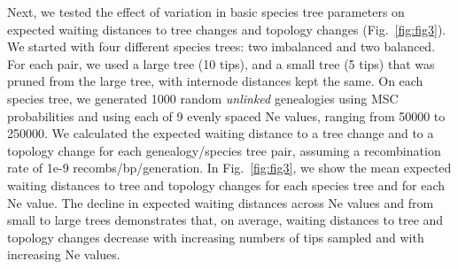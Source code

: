 \documentclass[11pt]{article}
\begin{document}

Next, we tested the effect of variation in basic species tree parameters on expected waiting 
distances to tree changes and topology changes (Fig.~\ref{fig:fig3}). We started with four 
different species trees: two imbalanced and two balanced. For each pair, we used a large tree 
(10 tips), and a small tree (5 tips) that was pruned from the large tree, with internode 
distances kept the same. On each species tree, we generated 1000 random \emph{unlinked} 
genealogies using MSC probabilities and using 
each of 9 evenly spaced Ne values, ranging from 50000 to 250000. We calculated the expected 
waiting distance 
to a tree change and to a topology change for each genealogy/species tree pair, assuming a 
recombination rate of 1e-9 recombs/bp/generation. In Fig.~\ref{fig:fig3}, we show the mean 
expected waiting distances to tree and topology changes for each species tree and for each Ne 
value. The decline in expected waiting distances across Ne values and from small to large 
trees demonstrates that, on average, waiting distances to tree and topology changes decrease 
with increasing numbers of tips sampled and with increasing Ne values. 
\end{document}
